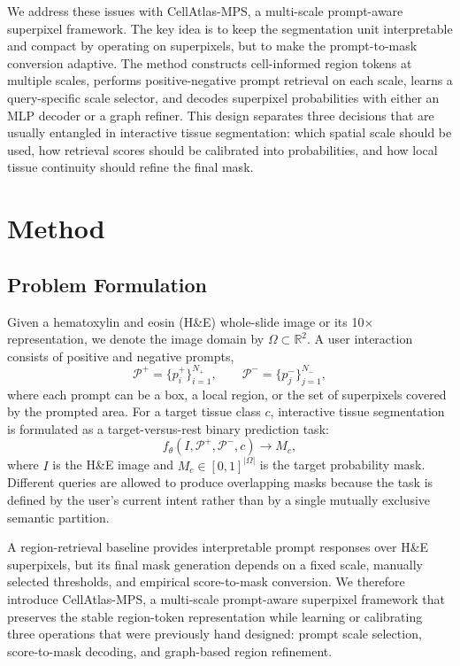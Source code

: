 \documentclass[letterpaper]{article} %
\begin{document}
We address these issues with CellAtlas-MPS, a multi-scale prompt-aware superpixel framework. The key idea is to keep the segmentation unit interpretable and compact by operating on superpixels, but to make the prompt-to-mask conversion adaptive. The method constructs cell-informed region tokens at multiple scales, performs positive-negative prompt retrieval on each scale, learns a query-specific scale selector, and decodes superpixel probabilities with either an MLP decoder or a graph refiner. This design separates three decisions that are usually entangled in interactive tissue segmentation: which spatial scale should be used, how retrieval scores should be calibrated into probabilities, and how local tissue continuity should refine the final mask.

\section{Method}

\subsection{Problem Formulation}

Given a hematoxylin and eosin (H\&E) whole-slide image or its 10$\times$ representation, we denote the image domain by $\Omega \subset \mathbb{R}^{2}$. A user interaction consists of positive and negative prompts,
\begin{equation}
    \mathcal{P}^{+}=\{p_i^{+}\}_{i=1}^{N_{+}}, \qquad
    \mathcal{P}^{-}=\{p_j^{-}\}_{j=1}^{N_{-}},
\end{equation}
where each prompt can be a box, a local region, or the set of superpixels covered by the prompted area. For a target tissue class $c$, interactive tissue segmentation is formulated as a target-versus-rest binary prediction task:
\begin{equation}
    f_{\theta}(I,\mathcal{P}^{+},\mathcal{P}^{-},c) \rightarrow M_c,
\end{equation}
where $I$ is the H\&E image and $M_c \in [0,1]^{|\Omega|}$ is the target probability mask. Different queries are allowed to produce overlapping masks because the task is defined by the user's current intent rather than by a single mutually exclusive semantic partition.

A region-retrieval baseline provides interpretable prompt responses over H\&E superpixels, but its final mask generation depends on a fixed scale, manually selected thresholds, and empirical score-to-mask conversion. We therefore introduce CellAtlas-MPS, a multi-scale prompt-aware superpixel framework that preserves the stable region-token representation while learning or calibrating three operations that were previously hand designed: prompt scale selection, score-to-mask decoding, and graph-based region refinement.
\end{document}
